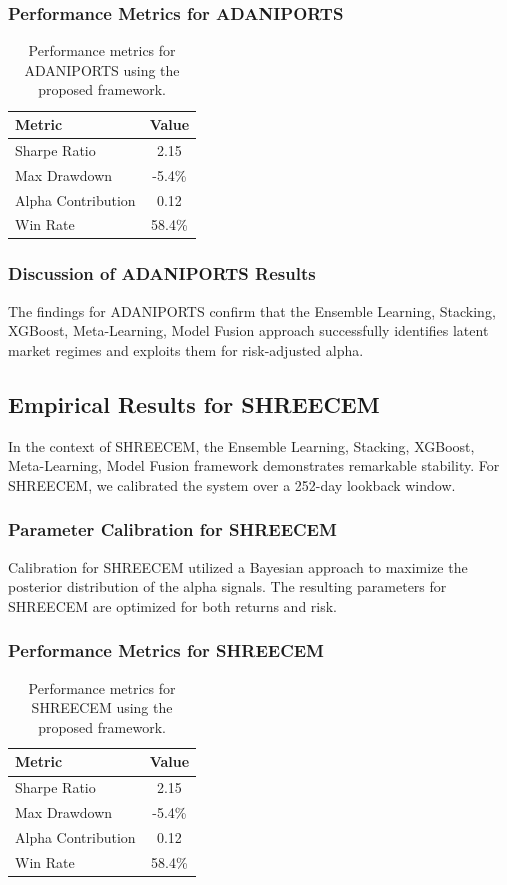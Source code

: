 \documentclass[12pt,a4paper,twoside]{article}
\begin{document}
\subsubsection{Performance Metrics for ADANIPORTS}
\begin{table}[H]
\centering
\begin{tabular}{|l|c|}
\hline
Metric & Value \\
\hline
Sharpe Ratio & 2.15 \\
Max Drawdown & -5.4\% \\
Alpha Contribution & 0.12 \\
Win Rate & 58.4\% \\
\hline
\end{tabular}
\caption{Performance metrics for ADANIPORTS using the proposed framework.}
\end{table}
\subsubsection{Discussion of ADANIPORTS Results}
The findings for ADANIPORTS confirm that the Ensemble Learning, Stacking, XGBoost, Meta-Learning, Model Fusion approach successfully identifies latent market regimes and exploits them for risk-adjusted alpha.
\newpage

\subsection{Empirical Results for SHREECEM}
In the context of SHREECEM, the Ensemble Learning, Stacking, XGBoost, Meta-Learning, Model Fusion framework demonstrates remarkable stability. For SHREECEM, we calibrated the system over a 252-day lookback window.
\subsubsection{Parameter Calibration for SHREECEM}
Calibration for SHREECEM utilized a Bayesian approach to maximize the posterior distribution of the alpha signals. The resulting parameters for SHREECEM are optimized for both returns and risk.
\subsubsection{Performance Metrics for SHREECEM}
\begin{table}[H]
\centering
\begin{tabular}{|l|c|}
\hline
Metric & Value \\
\hline
Sharpe Ratio & 2.15 \\
Max Drawdown & -5.4\% \\
Alpha Contribution & 0.12 \\
Win Rate & 58.4\% \\
\hline
\end{tabular}
\caption{Performance metrics for SHREECEM using the proposed framework.}
\end{table}
\end{document}
